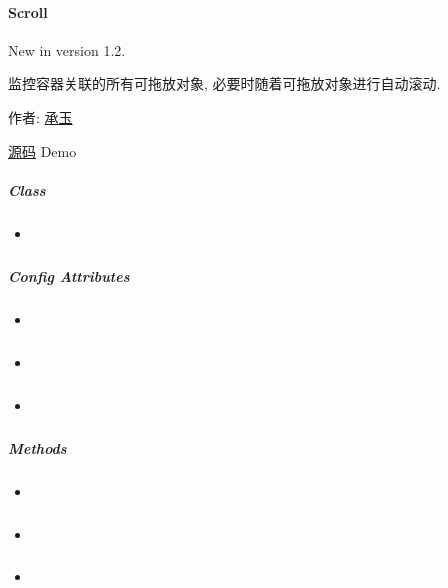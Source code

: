 \documentclass[letterpaper,10pt,english]{sphinxmanual}
\begin{document}
\label{api/component/dd/scroll:module-Scroll}

\paragraph{Scroll}
\label{api/component/dd/scroll::doc}\label{api/component/dd/scroll:scroll}New in version 1.2.
\begin{DUlineblock}{0em}
\item[] 监控容器关联的所有可拖放对象, 必要时随着可拖放对象进行自动滚动.
\item[] 作者: \href{mailto:chengyu@taobao.com}{承玉}
\item[] \href{https://github.com/kissyteam/kissy/tree/master/src/dd/scroll.js}{源码}  \textbar{} Demo
\end{DUlineblock}


\subparagraph{Class}
\label{api/component/dd/scroll:class}\begin{itemize}
\item {}
{\hyperref[api/component/dd/scroll:Scroll.Scroll]{}}

\end{itemize}


\subparagraph{Config Attributes}
\label{api/component/dd/scroll:config-attributes}\begin{itemize}
\item {}
{\hyperref[api/component/dd/scroll:Scroll.node]{}}

\item {}
{\hyperref[api/component/dd/scroll:Scroll.rate]{}}

\item {}
{\hyperref[api/component/dd/scroll:Scroll.diff]{}}

\end{itemize}


\subparagraph{Methods}
\label{api/component/dd/scroll:methods}\begin{itemize}
\item {}
{\hyperref[api/component/dd/scroll:Scroll.attach]{}}

\item {}
{\hyperref[api/component/dd/scroll:Scroll.unAttach]{}}

\item {}
{\hyperref[api/component/dd/scroll:Scroll.destroy]{}}

\end{itemize}
\end{document}
